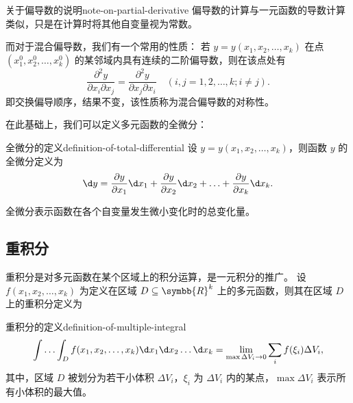 \begin{note}{关于偏导数的说明}{note-on-partial-derivative}
    偏导数的计算与一元函数的导数计算类似，只是在计算时将其他自变量视为常数。

    而对于混合偏导数，我们有一个常用的性质：
    若 $ y = y(x_1 , x_2 , \ldots , x_k) $ 在点 $ (x_1^0 , x_2^0 , \ldots , x_k^0) $ 的某邻域内具有连续的二阶偏导数，则在该点处有
    \begin{equation*}
        \frac{\partial^2 y}{\partial x_i \partial x_j} = \frac{\partial^2 y}{\partial x_j \partial x_i} \quad (i , j = 1, 2, \ldots , k; i \neq j) .
    \end{equation*}
    即交换偏导顺序，结果不变，该性质称为混合偏导数的对称性。
\end{note}

在此基础上，我们可以定义多元函数的全微分：
\begin{definition}{全微分的定义}{definition-of-total-differential}
    设 $ y = y(x_1 , x_2 , \ldots , x_k) $，则函数 $ y $ 的全微分定义为
    \begin{equation}
        \d y = \frac{\partial y}{\partial x_1} \d x_1 + \frac{\partial y}{\partial x_2} \d x_2 + \ldots + \frac{\partial y}{\partial x_k} \d x_k .
    \end{equation}
\end{definition}
全微分表示函数在各个自变量发生微小变化时的总变化量。

\subsection{重积分}\label{subsec:multiple-integral}

重积分是对多元函数在某个区域上的积分运算，是一元积分的推广。
设 $ f(x_1 , x_2 , \ldots , x_k) $ 为定义在区域 $ D \subseteq \symbb{R}^k $ 上的多元函数，则其在区域 $ D $ 上的重积分定义为
\begin{definition}{重积分的定义}{definition-of-multiple-integral}
    \begin{equation}
        \int \ldots \int_D f(x_1 , x_2 , \ldots , x_k) \d x_1 \d x_2 \ldots \d x_k = \lim_{\max \Delta V_i \to 0} \sum_{i} f(\xi_i) \Delta V_i ,
    \end{equation}
    其中，区域 $ D $ 被划分为若干小体积 $ \Delta V_i $，$ \xi_i $ 为 $ \Delta V_i $ 内的某点，$ \max \Delta V_i $ 表示所有小体积的最大值。
\end{definition}

